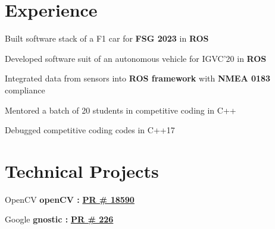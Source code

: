 \documentclass[letterpaper]{deedy-resume} %
\begin{document}
\begin{minipage}[t]{0.66\textwidth} %


\section{Experience}

\vspace{\topsep}
\begin{tightitemize}
\item Built software stack of a F1 car for {\bf FSG 2023} in \bf ROS
\end{tightitemize}

\begin{tightitemize}
\item Developed software suit of an autonomous vehicle for IGVC'20 in {\bf ROS}
\item Integrated data from sensors into {\bf{ROS framework}} with {\bf{NMEA 0183}} compliance
\end{tightitemize}

\sectionspace %


\begin{tightitemize}
\item Mentored a batch of 20 students in competitive coding in C++
\item Debugged competitive coding codes in C++17
\end{tightitemize}

\sectionspace %

\section{Technical Projects}

\vspace{0.2cm}
\begin{tightitemize}
\item OpenCV {\bf openCV :} \hspace{0.1cm} \href{https://github.com/opencv/opencv/pull/18590}{\textbf{PR \# 18590}}
\item Google {\bf gnostic :} \hspace{0.1cm} \href{https://github.com/google/gnostic/pull/226}{\textbf{PR \# 226}}
\end{tightitemize}

\end{minipage}
\end{document}
